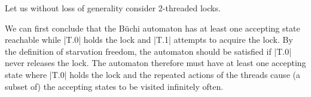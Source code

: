 

Let us without loss of generality consider 2-threaded locks. 

We can first conclude that the B{\"u}chi automaton has at least one accepting state reachable while |T.0| holds the lock and |T.1| attempts to acquire the lock. By the definition of starvation freedom, the automaton should be satisfied if |T.0| never releases the lock. The automaton therefore must have at least one accepting state where |T.0| holds the lock and the repeated actions of the threads cause (a subset of) the accepting states to be visited infinitely often.



